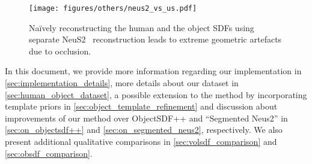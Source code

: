 \clearpage
\maketitlesupplementary


\begin{figure}    
    \texttt{[image: figures/others/neus2\_vs\_us.pdf]}
    \caption{Na\"ively reconstructing the human and the object SDFs using separate NeuS2~\cite{neus2} reconstruction leads to extreme geometric artefacts due to occlusion. 
    }
    \label{fig:naive_sdf}
    \vspace{-1em}
\end{figure}


In this document, we provide more information regarding our implementation in \cref{sec:implementation_details}, more details about our dataset in \cref{sec:human_object_dataset}, a possible extension to the method by incorporating template priors in \cref{sec:object_template_refinement} and discussion about improvements of our method over ObjectSDF++ and ``Segmented Neus2'' in \cref{sec:on_objectsdf++} and \cref{sec:on_segmented_neus2}, respectively. We also present additional qualitative comparisons in \cref{sec:volsdf_comparison} and \cref{sec:obsdf_comparison}.


